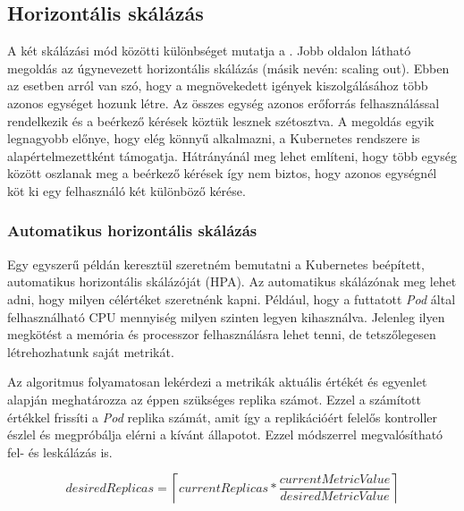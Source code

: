 \subsection{Horizontális skálázás}
A két skálázási mód közötti különbséget mutatja a . Jobb oldalon látható megoldás az úgynevezett horizontális skálázás (másik nevén: scaling out). Ebben az esetben arról van szó, hogy a megnövekedett igények kiszolgálásához több azonos egységet hozunk létre. Az összes egység azonos erőforrás felhasználással rendelkezik és a beérkező kérések köztük lesznek szétosztva. 
A megoldás egyik legnagyobb előnye, hogy elég könnyű alkalmazni, a Kubernetes rendszere is alapértelmezettként támogatja. Hátrányánál meg lehet említeni, hogy több egység között oszlanak meg a beérkező kérések így nem biztos, hogy azonos egységnél köt ki egy felhasználó két különböző kérése. 

\subsubsection{Automatikus horizontális skálázás}
\label{subsec:hpa}
Egy egyszerű példán keresztül szeretném bemutatni a Kubernetes beépített, automatikus horizontális skálázóját (HPA). Az automatikus skálázónak meg lehet adni, hogy milyen célértéket szeretnénk kapni. Például, hogy a futtatott \textit{Pod} által felhasználható CPU mennyiség milyen szinten legyen kihasználva. Jelenleg ilyen megkötést a memória és processzor felhasználásra lehet tenni, de tetszőlegesen létrehozhatunk saját metrikát. 

Az algoritmus folyamatosan lekérdezi a metrikák aktuális értékét és  egyenlet alapján meghatározza az éppen szükséges replika számot. Ezzel a számított értékkel frissíti a \textit{Pod} replika számát, amit így a replikációért felelős kontroller észlel és megpróbálja elérni a kívánt állapotot. Ezzel módszerrel megvalósítható fel- és leskálázás is.

\begin{equation}
\label{hpa_algo}
desiredReplicas = \left\lceil currentReplicas * \frac{currentMetricValue}{desiredMetricValue} \right\rceil
\end{equation}

